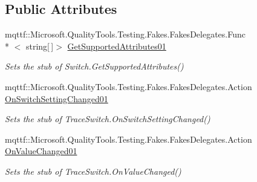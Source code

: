 \subsection*{Public Attributes}
\begin{DoxyCompactItemize}
\item 
mqttf\-::\-Microsoft.\-Quality\-Tools.\-Testing.\-Fakes.\-Fakes\-Delegates.\-Func\\*
$<$ string\mbox{[}$\,$\mbox{]}$>$ \hyperlink{class_system_1_1_diagnostics_1_1_fakes_1_1_stub_trace_switch_a40f34fb85c4c3da9dc34d58e3f99c793}{Get\-Supported\-Attributes01}
\begin{DoxyCompactList}\small\item\em Sets the stub of Switch.\-Get\-Supported\-Attributes()\end{DoxyCompactList}\item 
mqttf\-::\-Microsoft.\-Quality\-Tools.\-Testing.\-Fakes.\-Fakes\-Delegates.\-Action \hyperlink{class_system_1_1_diagnostics_1_1_fakes_1_1_stub_trace_switch_ab141e548404e7289e143a2d78ba4c782}{On\-Switch\-Setting\-Changed01}
\begin{DoxyCompactList}\small\item\em Sets the stub of Trace\-Switch.\-On\-Switch\-Setting\-Changed()\end{DoxyCompactList}\item 
mqttf\-::\-Microsoft.\-Quality\-Tools.\-Testing.\-Fakes.\-Fakes\-Delegates.\-Action \hyperlink{class_system_1_1_diagnostics_1_1_fakes_1_1_stub_trace_switch_a08faf212995eb887f0f43a3d493bcf0c}{On\-Value\-Changed01}
\begin{DoxyCompactList}\small\item\em Sets the stub of Trace\-Switch.\-On\-Value\-Changed()\end{DoxyCompactList}\end{DoxyCompactItemize}
